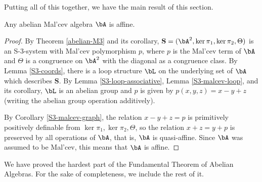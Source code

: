 Putting all of this together, we have the main result of this section.

\begin{thm}\label{abelian-malcev} Any abelian Mal'cev algebra $\bA$ is affine.
\end{thm}
\begin{proof} By Theorem \ref{abelian-M3} and its corollary, $\mathbf{S} = (\bA^2, \ker \pi_1, \ker \pi_2, \Theta)$ is an S-3-system with Mal'cev polymorphism $p$, where $p$ is the Mal'cev term of $\bA$ and $\Theta$ is a congruence on $\bA^2$ with the diagonal as a congruence class. By Lemma \ref{S3-coords}, there is a loop structure $\bL$ on the underlying set of $\bA$ which describes $\mathbf{S}$. By Lemma \ref{S3-loop-associative}, Lemma \ref{S3-malcev-loop}, and its corollary, $\bL$ is an abelian group and $p$ is given by $p(x,y,z) = x-y+z$ (writing the abelian group operation additively).

By Corollary \ref{S3-malcev-graph}, the relation $x-y+z=p$ is primitively positively definable from $\ker \pi_1, \ker \pi_2, \Theta$, so the relation $x+z = y+p$ is preserved by all operations of $\bA$, that is, $\bA$ is quasi-affine. Since $\bA$ was assumed to be Mal'cev, this means that $\bA$ is affine.
\end{proof}

We have proved the hardest part of the Fundamental Theorem of Abelian Algebras. For the sake of completeness, we include the rest of it.

